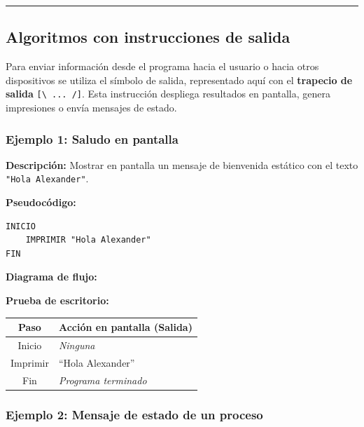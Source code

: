 \begin{center}\rule{0.5\linewidth}{0.5pt}\end{center}

\subsection{Algoritmos con instrucciones de
salida}\label{algoritmos-con-instrucciones-de-salida}

Para enviar información desde el programa hacia el usuario o hacia otros
dispositivos se utiliza el símbolo de salida, representado aquí con el
\textbf{trapecio de salida} \texttt{{[}\textbackslash{}\ ...\ /{]}}.
Esta instrucción despliega resultados en pantalla, genera impresiones o
envía mensajes de estado.

\subsubsection{Ejemplo 1: Saludo en
pantalla}\label{ejemplo-1-saludo-en-pantalla}

\textbf{Descripción:} Mostrar en pantalla un mensaje de bienvenida
estático con el texto \texttt{"Hola\ Alexander"}.

\textbf{Pseudocódigo:}

\begin{verbatim}
INICIO
    IMPRIMIR "Hola Alexander"
FIN
\end{verbatim}

\textbf{Diagrama de flujo:}



\textbf{Prueba de escritorio:}

{\def\LTcaptype{none} %
\begin{longtable}[]{@{}cl@{}}
\toprule\noalign{}
Paso & Acción en pantalla (Salida) \\
\midrule\noalign{}
\endhead
\bottomrule\noalign{}
\endlastfoot
Inicio & \emph{Ninguna} \\
Imprimir & ``Hola Alexander'' \\
Fin & \emph{Programa terminado} \\
\end{longtable}
}

\subsubsection{Ejemplo 2: Mensaje de estado de un
proceso}\label{ejemplo-2-mensaje-de-estado-de-un-proceso}

